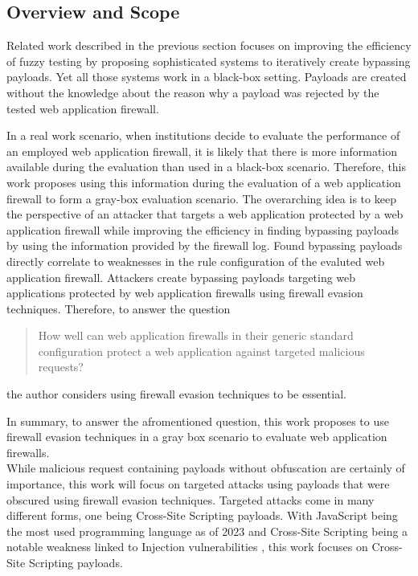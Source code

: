 \subsection{Overview and Scope}
Related work described in the previous section focuses on improving the efficiency of fuzzy testing by proposing sophisticated systems to iteratively create bypassing payloads. Yet all those systems work in a black-box setting. Payloads are created without the knowledge about the reason why a payload was rejected by the tested web application firewall.

In a real work scenario, when institutions decide to evaluate the performance of an employed web application firewall, it is likely that there is more information available during the evaluation than used in a black-box scenario. 
Therefore, this work proposes using this information during the evaluation of a web application firewall to form a gray-box evaluation scenario. 
The overarching idea is to keep the perspective of an attacker that targets a web application protected by a web application firewall while improving the efficiency in finding bypassing payloads by using the information provided by the firewall log. 
Found bypassing payloads directly correlate to weaknesses in the rule configuration of the evaluted web application firewall.
Attackers create bypassing payloads targeting web applications protected by web application firewalls using firewall evasion techniques. 
Therefore, to answer the question
\begin{quote}
How well can web application firewalls in their generic standard configuration
protect a web application against targeted malicious requests?
\end{quote}
the author considers using firewall evasion techniques to be essential.

In summary, to answer the afromentioned question, this work proposes to use firewall evasion techniques in a gray box scenario to evaluate web application firewalls. \\

While malicious request containing payloads without obfuscation are certainly of importance, this work will focus on targeted attacks using payloads that were obscured using firewall evasion techniques.
Targeted attacks come in many different forms, one being Cross-Site Scripting payloads.
With JavaScript being the most used programming language as of 2023 \cite{statista/mostusedlang} and Cross-Site Scripting being a notable weakness linked to Injection vulnerabilities \cite{OWASP/Injection21}, this work focuses on Cross-Site Scripting payloads.

